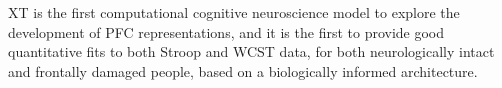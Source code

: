 


XT is the first computational cognitive neuroscience model to explore
the development of PFC representations, and it is the first to provide
good quantitative fits to both Stroop and WCST data, for both
neurologically intact and frontally damaged people, based on a biologically informed architecture.


